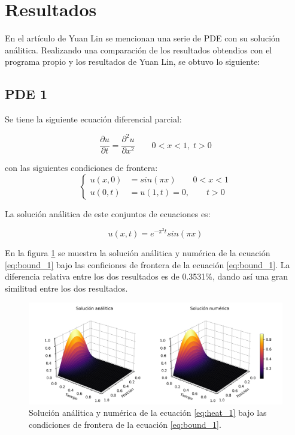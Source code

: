 \section{Resultados}

En el artículo de Yuan Lin\cite{yuan_2009} se mencionan una serie de PDE con su solución análitica. Realizando una comparación de los resultados obtendios con el programa propio y los resultados de Yuan Lin, se obtuvo lo siguiente:

\subsection{PDE 1}

Se tiene la siguiente ecuación diferencial parcial:

\begin{equation}
	\frac{\partial u}{\partial t} = \frac{\partial^2 u}{\partial x^2} \qquad 0<x<1, \; t>0 \label{eq:heat_1}
\end{equation}

con las siguientes condiciones de frontera:
\begin{equation}
	\begin{cases}
		u(x,0) & = sin(\pi x) \qquad 0<x<1 \\
		u(0,t) & =u(1,t) = 0, \qquad t>0
	\end{cases} \label{eq:bound_1}
\end{equation}

La solución análitica de este conjuntos de ecuaciones es:

\begin{equation}
	u(x,t)= e^{-\pi^2 t}sin(\pi x) \label{eq:sol_1}
\end{equation}

En la figura \ref{fig:sol_1} se muestra la solución análitica y numérica de la ecuación \ref{eq:bound_1} bajo las conficiones de frontera de la ecuación \ref{eq:bound_1}. La diferencia relativa entre los dos resultados es de 0.3531\%, dando así una gran similitud entre los dos resultados.

\begin{figure}[H]
	\centering
	\includegraphics[width=17cm]{Graphics/surface_1.png}
	\caption{Solución análitica y numérica de la ecuación \ref{eq:heat_1} bajo las condiciones de frontera de la ecuación \ref{eq:bound_1}.}
	\label{fig:sol_1}
\end{figure}

